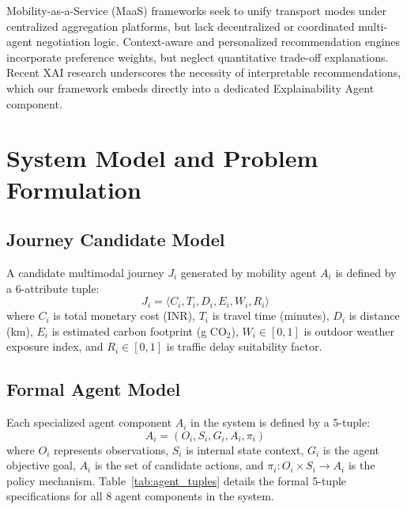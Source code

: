\documentclass[runningheads]{llncs}
\begin{document}
Mobility-as-a-Service (MaaS) frameworks \cite{hensher2017future, wong2020mobility, utriainen2018review} seek to unify transport modes under centralized aggregation platforms, but lack decentralized or coordinated multi-agent negotiation logic. Context-aware and personalized recommendation engines \cite{jarosik2021weather, liu2022context, sun2023personalized} incorporate preference weights, but neglect quantitative trade-off explanations. Recent XAI research \cite{ribeiro2016why, lundberg2017unified, guidotti2018survey, sovacool2021decarbonizing} underscores the necessity of interpretable recommendations, which our framework embeds directly into a dedicated Explainability Agent component.


\section{System Model and Problem Formulation}
\label{sec:system_model}

\subsection{Journey Candidate Model}
A candidate multimodal journey $J_i$ generated by mobility agent $A_i$ is defined by a 6-attribute tuple:
\begin{equation}
J_i = \langle C_i, T_i, D_i, E_i, W_i, R_i \rangle
\end{equation}
where $C_i$ is total monetary cost (INR), $T_i$ is travel time (minutes), $D_i$ is distance (km), $E_i$ is estimated carbon footprint (g $\text{CO}_2$), $W_i \in [0, 1]$ is outdoor weather exposure index, and $R_i \in [0, 1]$ is traffic delay suitability factor.

\subsection{Formal Agent Model}
Each specialized agent component $A_i$ in the system is defined by a 5-tuple:
\begin{equation}
A_i = \left( O_i, S_i, G_i, A_i, \pi_i \right)
\end{equation}
where $O_i$ represents observations, $S_i$ is internal state context, $G_i$ is the agent objective goal, $A_i$ is the set of candidate actions, and $\pi_i: O_i \times S_i \rightarrow A_i$ is the policy mechanism. Table~\ref{tab:agent_tuples} details the formal 5-tuple specifications for all 8 agent components in the system.
\end{document}
